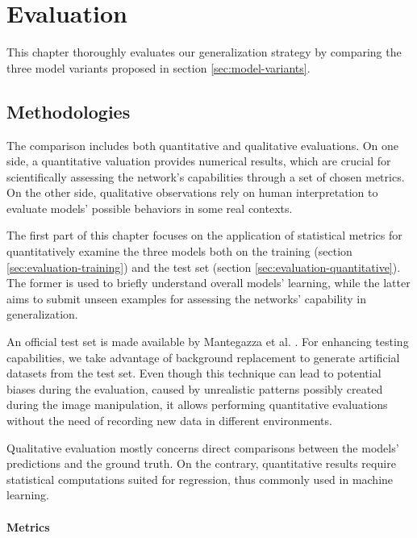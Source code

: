 \chapter{Evaluation}
\label{chap:evaluation}


This chapter thoroughly evaluates our generalization strategy by comparing the three model variants proposed in section \ref{sec:model-variants}.



\section{Methodologies}
\label{sec:evaluation-methods}

The comparison includes both quantitative and qualitative evaluations. On one side, a quantitative valuation provides numerical results, which are crucial for scientifically assessing the network's capabilities through a set of chosen metrics. On the other side, qualitative observations rely on human interpretation to evaluate models' possible behaviors in some real contexts.

The first part of this chapter focuses on the application of statistical metrics for quantitatively examine the three models both on the training (section \ref{sec:evaluation-training}) and the test set (section \ref{sec:evaluation-quantitative}). The former is used to briefly understand overall models' learning, while the latter aims to submit unseen examples for assessing the networks' capability in generalization.

An official test set is made available by Mantegazza et al. \cite{mantegazza2019visionbased}. For enhancing testing capabilities, we take advantage of background replacement to generate artificial datasets from the test set. Even though this technique can lead to potential biases during the evaluation, caused by unrealistic patterns possibly created during the image manipulation, it allows performing quantitative evaluations without the need of recording new data in different environments.

Qualitative evaluation mostly concerns direct comparisons between the models' predictions and the ground truth. On the contrary, quantitative results require statistical computations suited for regression, thus commonly used in machine learning. 

\subsubsection*{Metrics}

